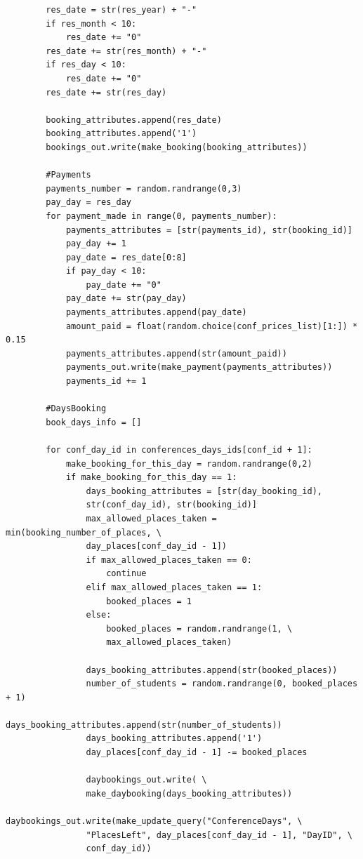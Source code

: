 \documentclass[12pt, a4paper]{mwrep}
\begin{document}
\begin{lstlisting}
        res_date = str(res_year) + "-"
        if res_month < 10:
            res_date += "0"
        res_date += str(res_month) + "-"
        if res_day < 10:
            res_date += "0"
        res_date += str(res_day)
        
        booking_attributes.append(res_date)
        booking_attributes.append('1')
        bookings_out.write(make_booking(booking_attributes))
        
        #Payments        
        payments_number = random.randrange(0,3)
        pay_day = res_day
        for payment_made in range(0, payments_number):
            payments_attributes = [str(payments_id), str(booking_id)]
            pay_day += 1
            pay_date = res_date[0:8]
            if pay_day < 10:
                pay_date += "0"
            pay_date += str(pay_day)
            payments_attributes.append(pay_date)
            amount_paid = float(random.choice(conf_prices_list)[1:]) * 0.15
            payments_attributes.append(str(amount_paid))
            payments_out.write(make_payment(payments_attributes))
            payments_id += 1
        
        #DaysBooking
        book_days_info = []
        
        for conf_day_id in conferences_days_ids[conf_id + 1]:
            make_booking_for_this_day = random.randrange(0,2)
            if make_booking_for_this_day == 1:
                days_booking_attributes = [str(day_booking_id), 
                str(conf_day_id), str(booking_id)]
                max_allowed_places_taken = min(booking_number_of_places, \
                day_places[conf_day_id - 1])
                if max_allowed_places_taken == 0:
                    continue
                elif max_allowed_places_taken == 1:
                    booked_places = 1
                else:
                    booked_places = random.randrange(1, \
                    max_allowed_places_taken)
                    
                days_booking_attributes.append(str(booked_places))
                number_of_students = random.randrange(0, booked_places + 1)
                days_booking_attributes.append(str(number_of_students))
                days_booking_attributes.append('1')
                day_places[conf_day_id - 1] -= booked_places
                
                daybookings_out.write( \ 
                make_daybooking(days_booking_attributes))
                daybookings_out.write(make_update_query("ConferenceDays", \
                "PlacesLeft", day_places[conf_day_id - 1], "DayID", \
                conf_day_id))
                

\end{lstlisting}
\end{document}
